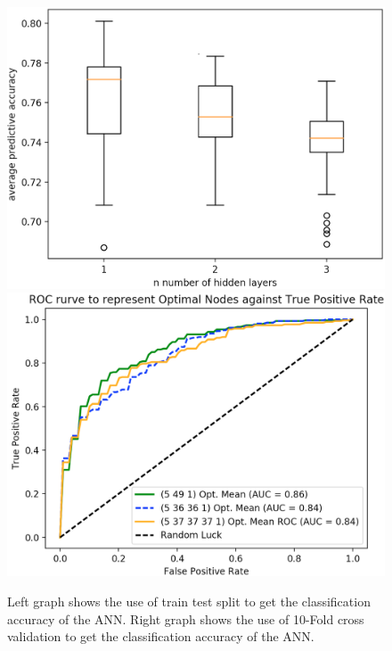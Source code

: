 \documentclass[11pt]{article}
\begin{document}
\begin{figure}[h]
\centering
\includegraphics[scale = .40]{reduc}
\includegraphics[scale = .40]{roc1}
\caption{Left graph shows the use of train test split to get the classification accuracy of the ANN. Right graph shows the use of 10-Fold cross validation to get the classification accuracy of the ANN. } 
\end{figure}
\end{document}
